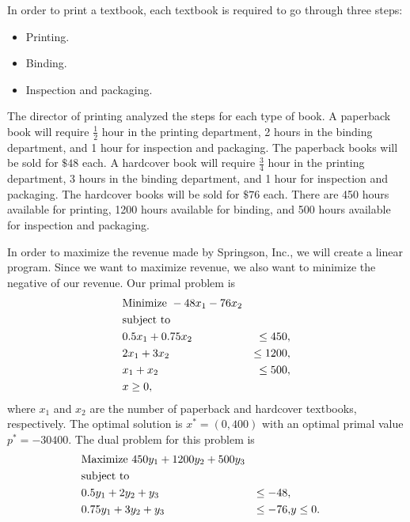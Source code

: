 	In order to print a textbook, each textbook is required to go through three steps:
	\begin{itemize}
		\item Printing.
		
		\item Binding.
		
		\item Inspection and packaging.
	\end{itemize}
	
	The director of printing analyzed the steps for each type of book. A paperback book will require $\frac{1}{2}$ hour in the printing department, 2 hours in the binding department, and 1 hour for inspection and packaging. The paperback books will be sold for $\$48$ each. A hardcover book will require $\frac{3}{4}$ hour in the printing department, 3 hours in the binding department, and 1 hour for inspection and packaging. The hardcover books will be sold for $\$76$ each. There are 450 hours available for printing, 1200 hours available for binding, and 500 hours available for inspection and packaging. 
	
	In order to maximize the revenue made by Springson, Inc., we will create a linear program. Since we want to maximize revenue, we also want to minimize the negative of our revenue. Our primal problem is
	\begin{equation} \label{lp primal simple example 2}
		\begin{aligned}
			&\textnormal{Minimize } -48 x_1 - 76 x_2 \\
			&\textnormal{subject to } \\
			&0.5x_1 + 0.75 x_2 &\leq 450, \\
			&2x_1 +3x_2 &\leq 1200, \\
			&x_1 +x_2 &\leq 500, \\
			&	x \geq 0,
		\end{aligned}
	\end{equation}
	where $x_1$ and $x_2$ are the number of paperback and hardcover textbooks, respectively. The optimal solution is $x^* = (0, 400)$ with an optimal primal value $p^* = -30400$. The dual problem for this problem is
	\begin{equation} \label{lp dual simple example 2}
		\begin{aligned}
			&\textnormal{Maximize } 450y_1 + 1200y_2 + 500y_3 \\
			&\textnormal{subject to } \\
			&0.5y_1 + 2 y_2 + y_3 &\leq -48, \\
			&0.75y_1 +3y_2 + y_3 &\leq -76,
			& y \leq 0.
		\end{aligned}
	\end{equation}
	
